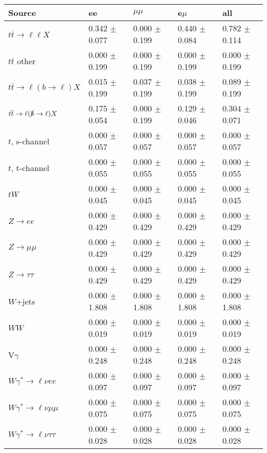 \begin{tabular}{l | l l l l}
\hline\hline
 Source  &  ee  &  $\mu\mu$  &  e$\mu$  &  all \\
\hline
$t\overline{t}\rightarrow \ell\ell X$ &  0.342 $\pm$  0.077 &  0.000 $\pm$  0.199 &  0.440 $\pm$  0.084 &  0.782 $\pm$  0.114\\
$t\overline{t}$ other &  0.000 $\pm$  0.199 &  0.000 $\pm$  0.199 &  0.000 $\pm$  0.199 &  0.000 $\pm$  0.199\\
$t\overline{t}\rightarrow \ell(b\rightarrow \ell)X$ &  0.015 $\pm$  0.199 &  0.037 $\pm$  0.199 &  0.038 $\pm$  0.199 &  0.089 $\pm$  0.199\\
$t\overline{t}\rightarrow \ell(\slashed{b}\rightarrow \ell)X$ &  0.175 $\pm$  0.054 &  0.000 $\pm$  0.199 &  0.129 $\pm$  0.046 &  0.304 $\pm$  0.071\\
\hline
$t$, s-channel &  0.000 $\pm$  0.057 &  0.000 $\pm$  0.057 &  0.000 $\pm$  0.057 &  0.000 $\pm$  0.057\\
$t$, t-channel &  0.000 $\pm$  0.055 &  0.000 $\pm$  0.055 &  0.000 $\pm$  0.055 &  0.000 $\pm$  0.055\\
$tW$ &  0.000 $\pm$  0.045 &  0.000 $\pm$  0.045 &  0.000 $\pm$  0.045 &  0.000 $\pm$  0.045\\
\hline
$Z\rightarrow ee$ &  0.000 $\pm$  0.429 &  0.000 $\pm$  0.429 &  0.000 $\pm$  0.429 &  0.000 $\pm$  0.429\\
$Z\rightarrow\mu\mu$ &  0.000 $\pm$  0.429 &  0.000 $\pm$  0.429 &  0.000 $\pm$  0.429 &  0.000 $\pm$  0.429\\
$Z\rightarrow\tau\tau$ &  0.000 $\pm$  0.429 &  0.000 $\pm$  0.429 &  0.000 $\pm$  0.429 &  0.000 $\pm$  0.429\\
$W$+jets &  0.000 $\pm$  1.808 &  0.000 $\pm$  1.808 &  0.000 $\pm$  1.808 &  0.000 $\pm$  1.808\\
$WW$ &  0.000 $\pm$  0.019 &  0.000 $\pm$  0.019 &  0.000 $\pm$  0.019 &  0.000 $\pm$  0.019\\
\hline
V$\gamma$ &  0.000 $\pm$  0.248 &  0.000 $\pm$  0.248 &  0.000 $\pm$  0.248 &  0.000 $\pm$  0.248\\
$W\gamma^{*}\rightarrow\ell\nu e e$ &  0.000 $\pm$  0.097 &  0.000 $\pm$  0.097 &  0.000 $\pm$  0.097 &  0.000 $\pm$  0.097\\
$W\gamma^{*}\rightarrow\ell\nu\mu\mu$ &  0.000 $\pm$  0.075 &  0.000 $\pm$  0.075 &  0.000 $\pm$  0.075 &  0.000 $\pm$  0.075\\
$W\gamma^{*}\rightarrow\ell\nu\tau\tau$ &  0.000 $\pm$  0.028 &  0.000 $\pm$  0.028 &  0.000 $\pm$  0.028 &  0.000 $\pm$  0.028\\

\end{tabular}
